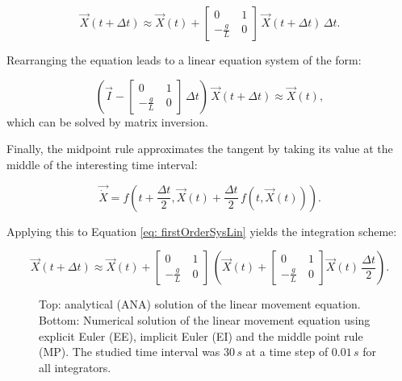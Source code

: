 \documentclass[12pt,bibstyle=none,pagenumberinfooter]{ifmdocument}
\begin{document}
\begin{equation}
    \Vec{X}(t+\Delta t) \approx \Vec{X}(t) + \begin{bmatrix}
        0 & 1 \\ -\frac{g}{L}\ & 0
    \end{bmatrix} \, \Vec{X}(t+\Delta t) \, \Delta t.
\end{equation}

Rearranging the equation leads to a linear equation system of the form:

\begin{equation}
    \left(\vec{I} - \begin{bmatrix}
        0 & 1 \\ -\frac{g}{L}\ & 0
    \end{bmatrix}\,\Delta t \right)\,\Vec{X}(t+\Delta t) \approx \Vec{X}(t),
\end{equation}
which can be solved by matrix inversion.

Finally, the midpoint rule approximates the tangent by taking its value at the middle of the interesting time interval:

\begin{equation}
    \Vec{\Dot{X}} = f\left( t+\frac{\Delta t}{2}, \Vec{X}(t) + \frac{\Delta t}{2}\,f\left(t, \Vec{X}(t)\right) \right).
\end{equation}

Applying this to Equation \ref{eq: firstOrderSysLin} yields the integration scheme:

\begin{equation}
    \Vec{X}(t+\Delta t) \approx \vec{X}(t) + \begin{bmatrix}
        0 & 1 \\ -\frac{g}{L}\ & 0
    \end{bmatrix}\,\left(\Vec{X}(t) + \begin{bmatrix}
            0 & 1 \\ -\frac{g}{L}\ & 0
        \end{bmatrix} \Vec{X}(t)\, \frac{\Delta t}{2} \right).
\end{equation}


\begin{figure}[h]
    \centering
    \setlength{\figH}{0.3\textheight}
    \setlength{\figW}{0.6\textwidth}
    
    \caption{Top: analytical (ANA) solution of the linear movement equation. Bottom: Numerical solution of the linear movement equation using explicit Euler (EE), implicit Euler (EI) and the middle point rule (MP). The studied time interval was $30\,s$ at a time step of $0.01\,s$ for all integrators.}
    \label{fig:LinSolutions}
\end{figure}
\end{document}
